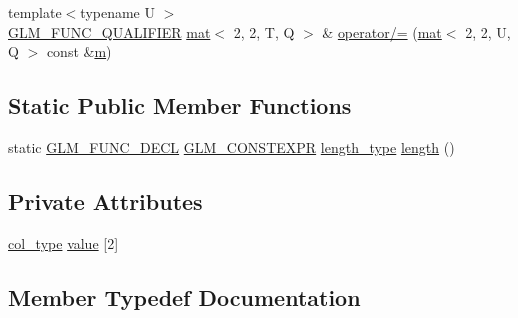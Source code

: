 \begin{DoxyCompactItemize}
\item 
{\footnotesize template$<$typename U $>$ }\\\hyperlink{setup_8hpp_a33fdea6f91c5f834105f7415e2a64407}{G\+L\+M\+\_\+\+F\+U\+N\+C\+\_\+\+Q\+U\+A\+L\+I\+F\+I\+ER} \hyperlink{structglm_1_1mat}{mat}$<$ 2, 2, T, Q $>$ \& \hyperlink{structglm_1_1mat_3_012_00_012_00_01_t_00_01_q_01_4_a2ccd7dd34be3dad08262d075de391ed8}{operator/=} (\hyperlink{structglm_1_1mat}{mat}$<$ 2, 2, U, Q $>$ const \&\hyperlink{_s_d_l__opengl__glext_8h_af593500c283bf1a787a6f947f503a5c2}{m})
\end{DoxyCompactItemize}
\subsection*{Static Public Member Functions}
\begin{DoxyCompactItemize}
\item 
static \hyperlink{setup_8hpp_ab2d052de21a70539923e9bcbf6e83a51}{G\+L\+M\+\_\+\+F\+U\+N\+C\+\_\+\+D\+E\+CL} \hyperlink{setup_8hpp_a08b807947b47031d3a511f03f89645ad}{G\+L\+M\+\_\+\+C\+O\+N\+S\+T\+E\+X\+PR} \hyperlink{structglm_1_1mat_3_012_00_012_00_01_t_00_01_q_01_4_a96c65b091fc8fe8e6f5637e30c9c1f81}{length\+\_\+type} \hyperlink{structglm_1_1mat_3_012_00_012_00_01_t_00_01_q_01_4_a7b681dcae80386d30308def77cd2646e}{length} ()
\end{DoxyCompactItemize}
\subsection*{Private Attributes}
\begin{DoxyCompactItemize}
\item 
\hyperlink{structglm_1_1mat_3_012_00_012_00_01_t_00_01_q_01_4_a2983591534ee443dd378cedcbe771749}{col\+\_\+type} \hyperlink{structglm_1_1mat_3_012_00_012_00_01_t_00_01_q_01_4_a68d5d8eb032c2089e37ffe09c786da80}{value} \mbox{[}2\mbox{]}
\end{DoxyCompactItemize}


\subsection{Member Typedef Documentation}
\mbox{\label{structglm_1_1mat_3_012_00_012_00_01_t_00_01_q_01_4_a2983591534ee443dd378cedcbe771749}} 
